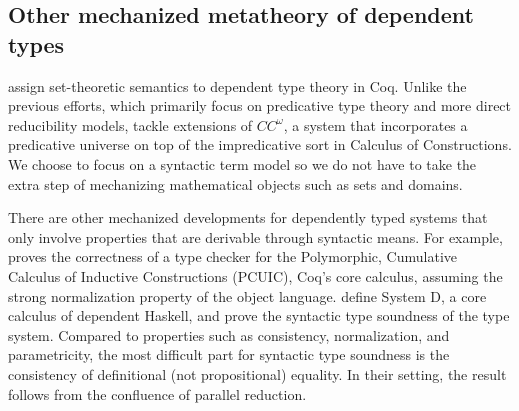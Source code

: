 \documentclass[acmsmall,screen=true,
\ifpublic review=false\else,review=true\fi
  ,anonymous=\ifanonymous true\else false\fi]{acmart}
\begin{document}
\subsection{Other mechanized metatheory of dependent types}

\citet{barras2010sets, Wang2013SemanticsOI} assign
set-theoretic semantics to dependent type theory in Coq. Unlike the
previous efforts, which primarily focus on predicative
type theory and more direct reducibility models,
\citet{barras2010sets, Wang2013SemanticsOI} tackle extensions of
$CC^\omega$, a system that incorporates a predicative universe on top
of the impredicative sort in Calculus of Constructions. We choose to
focus on a syntactic term model so we do not have to take the extra step
of mechanizing mathematical objects such as sets and domains.

There are other mechanized developments for dependently typed systems that
only involve properties that are derivable through syntactic means. For
example, \citet{coqcoqcorrect2019} proves the correctness of a type checker
for the Polymorphic, Cumulative Calculus of Inductive Constructions (PCUIC),
Coq's core calculus, assuming the strong normalization property of the object
language. \citet{weirich:systemd} define System D, a core calculus of
dependent Haskell, and prove the syntactic type soundness of the type
system. Compared to properties such as consistency, normalization, and
parametricity, the most difficult part for syntactic type soundness is the
consistency of definitional (not propositional) equality. In their setting,
the result follows from the confluence of parallel reduction.
\end{document}
